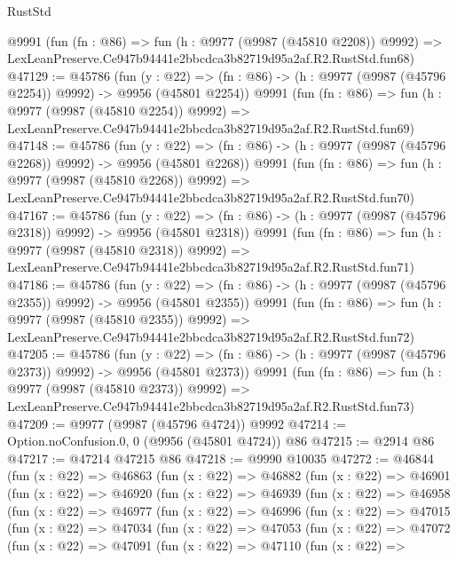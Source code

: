 \begin{lexlean}{RustStd}
\begin{coremodule}
    @9991
    (fun (fn : @86) =>
    fun (h : @9977 (@9987 (@45810 @2208)) @9992) =>
    LexLeanPreserve.Ce947b94441e2bbcdca3b82719d95a2af.R2.RustStd.fun68)
@47129 := @45786
    (fun (y : @22) =>
    (fn : @86) -> (h : @9977 (@9987 (@45796 @2254)) @9992) -> @9956 (@45801 @2254))
    @9991
    (fun (fn : @86) =>
    fun (h : @9977 (@9987 (@45810 @2254)) @9992) =>
    LexLeanPreserve.Ce947b94441e2bbcdca3b82719d95a2af.R2.RustStd.fun69)
@47148 := @45786
    (fun (y : @22) =>
    (fn : @86) -> (h : @9977 (@9987 (@45796 @2268)) @9992) -> @9956 (@45801 @2268))
    @9991
    (fun (fn : @86) =>
    fun (h : @9977 (@9987 (@45810 @2268)) @9992) =>
    LexLeanPreserve.Ce947b94441e2bbcdca3b82719d95a2af.R2.RustStd.fun70)
@47167 := @45786
    (fun (y : @22) =>
    (fn : @86) -> (h : @9977 (@9987 (@45796 @2318)) @9992) -> @9956 (@45801 @2318))
    @9991
    (fun (fn : @86) =>
    fun (h : @9977 (@9987 (@45810 @2318)) @9992) =>
    LexLeanPreserve.Ce947b94441e2bbcdca3b82719d95a2af.R2.RustStd.fun71)
@47186 := @45786
    (fun (y : @22) =>
    (fn : @86) -> (h : @9977 (@9987 (@45796 @2355)) @9992) -> @9956 (@45801 @2355))
    @9991
    (fun (fn : @86) =>
    fun (h : @9977 (@9987 (@45810 @2355)) @9992) =>
    LexLeanPreserve.Ce947b94441e2bbcdca3b82719d95a2af.R2.RustStd.fun72)
@47205 := @45786
    (fun (y : @22) =>
    (fn : @86) -> (h : @9977 (@9987 (@45796 @2373)) @9992) -> @9956 (@45801 @2373))
    @9991
    (fun (fn : @86) =>
    fun (h : @9977 (@9987 (@45810 @2373)) @9992) =>
    LexLeanPreserve.Ce947b94441e2bbcdca3b82719d95a2af.R2.RustStd.fun73)
@47209 := @9977 (@9987 (@45796 @4724)) @9992
@47214 := Option.noConfusion.{0, 0} (@9956 (@45801 @4724)) @86
@47215 := @2914 @86
@47217 := @47214 @47215 @86
@47218 := @9990 @10035
@47272 := @46844
    (fun (x : @22) =>
    @46863
      (fun (x : @22) =>
      @46882
        (fun (x : @22) =>
        @46901
          (fun (x : @22) =>
          @46920
            (fun (x : @22) =>
            @46939
              (fun (x : @22) =>
              @46958
                (fun (x : @22) =>
                @46977
                  (fun (x : @22) =>
                  @46996
                    (fun (x : @22) =>
                    @47015
                      (fun (x : @22) =>
                      @47034
                        (fun (x : @22) =>
                        @47053
                          (fun (x : @22) =>
                          @47072
                            (fun (x : @22) =>
                            @47091
                              (fun (x : @22) =>
                              @47110
                                (fun (x : @22) =>

\end{coremodule}
\end{lexlean}
